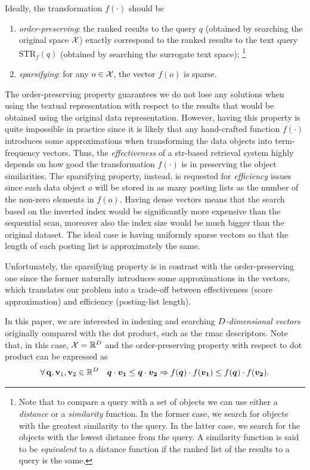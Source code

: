 Ideally, the transformation $f(\cdot)$ should be
\begin{enumerate}
    \item \emph{order-preserving}:  the ranked results to the query $q$ (obtained by searching the original space $\mathcal{X}$) exactly correspond to the ranked results to the text query $\text{STR}_f(q)$ (obtained by searching the surrogate text space);%
\footnote{Note that to compare a query with a set of objects we can use either a \emph{distance} or a \emph{similarity} function.
In the former case, we search for objects with the greatest similarity to the query.
In the latter case, we search for the objects with the lowest distance from the query. A similarity function is said to be \emph{equivalent} to a distance function if the ranked list of the results to a query is the same.}
    \item \emph{sparsifying}: for any $o \in\mathcal{X}$, the vector $f(o)$ is sparse.
\end{enumerate}

The order-preserving property guarantees we do not lose any solutions when using the textual representation with respect to the results that would be obtained using the original data representation.
However, having this property is quite impossible in practice since it is likely that any hand-crafted function $f(\cdot)$ introduces some approximations when transforming the data objects into term-frequency vectors.
Thus, the \emph{effectiveness} of a \gls{str}-based retrieval system highly depends on how good the transformation $f(\cdot)$ is in preserving the object similarities.
The sparsifying property, instead, is requested for \emph{efficiency} issues since each data object $o$ will be stored in as many posting lists as the number of the non-zero elements in $f(o)$.
Having dense vectors means that the search based on the inverted index would be significantly more expensive than the sequential scan, moreover also the index size would be much bigger than the original dataset.
The ideal case is having uniformly sparse vectors so that the length of each posting list is approximately the same.

Unfortunately, the sparsifying property is in contrast with the order-preserving one since the former naturally introduces some approximations in the vectors, which translates our problem into a trade-off between effectiveness (score approximation) and efficiency (posting-list length).

In this paper, we are interested in indexing and searching \emph{${D}$-dimensional vectors} originally compared with the dot product, such as the \gls{rmac} descriptors. Note that, in this case, $\mathcal{X}=\mathbb{R}^{{D}}$ and the order-preserving property with respect to dot product can be expressed as
\begin{equation}
\forall\, \mathbf{q},\mathbf{v}_1,\mathbf{v}_2 \in \mathbb{R}^{{D}} \quad \boldsymbol {q}\cdot \boldsymbol {v_1} \leq \boldsymbol {q}\cdot \boldsymbol { v_2} \Rightarrow f(\boldsymbol {q})\cdot f(\boldsymbol {v_1}) \leq f(\boldsymbol {q})\cdot f(\boldsymbol {v_2}).
\end{equation}

